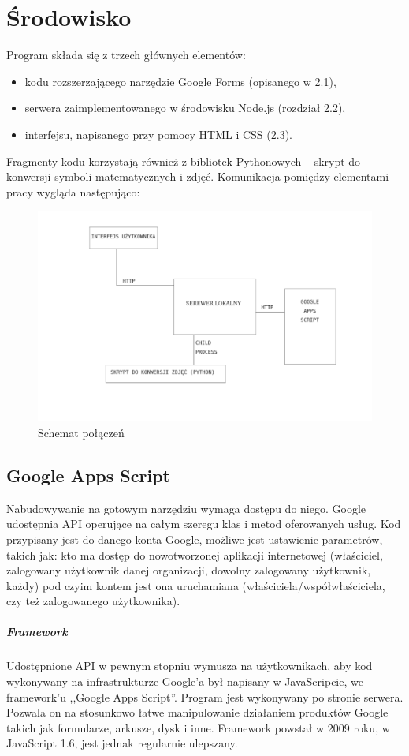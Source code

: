 \chapter{Środowisko} 
Program składa się z trzech głównych elementów:
\begin{itemize}
\item kodu rozszerzającego narzędzie Google Forms (opisanego w 2.1),
\item serwera zaimplementowanego w środowisku Node.js (rozdział 2.2),
\item interfejsu, napisanego przy pomocy HTML i CSS (2.3).
\end{itemize}
\ind Fragmenty kodu korzystają również z bibliotek Pythonowych -- skrypt do konwersji symboli matematycznych i zdjęć.
\ind Komunikacja pomiędzy elementami pracy wygląda następująco:
\begin{figure}[H]
  \includegraphics[scale=0.75]{schemat.png}
  \caption{Schemat połączeń}
  \label{fig:1}
\end{figure}

\section{Google Apps Script}
Nabudowywanie na gotowym narzędziu wymaga dostępu do niego. Google udostępnia API operujące na całym szeregu klas i metod oferowanych usług. Kod przypisany jest do danego konta Google, możliwe jest ustawienie parametrów,  takich  jak: kto ma dostęp do nowotworzonej aplikacji internetowej (właściciel, zalogowany użytkownik danej organizacji, dowolny zalogowany użytkownik, każdy) pod czyim kontem jest ona uruchamiana (właściciela/współwłaściciela, czy też zalogowanego użytkownika). 

\paragraph{Framework}
Udostępnione API w pewnym stopniu wymusza na użytkownikach, aby kod wykonywany na infrastrukturze Google'a był napisany w JavaScripcie, we framework'u ,,Google Apps Script''. Program jest wykonywany po stronie serwera. Pozwala on na stosunkowo łatwe manipulowanie działaniem produktów Google takich jak formularze, arkusze, dysk i inne. 
\ind Framework powstał w 2009 roku, w JavaScript 1.6, jest jednak regularnie ulepszany.


